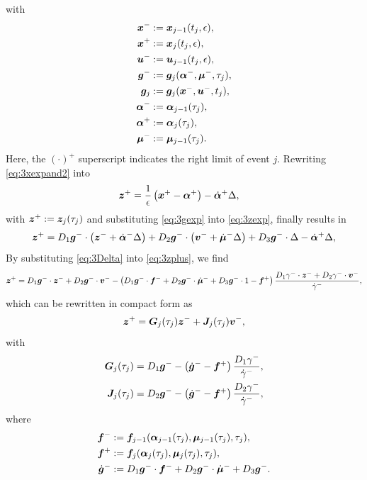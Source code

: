 \documentclass[../DC2017114Bouma.tex]{subfiles}
\begin{document}
with
\begin{align*}
\xb^- &:= \xb_{j-1}(t_{j},\epsilon),\\
\xb^+ &:= \xb_{j}(t_{j},\epsilon),\\
\ub^- &:= \ub_{j-1}(t_{j},\epsilon),\\
\gb^- &:= \gb_j(\alphab^-,\mub^-,\tau_j),\\
\gb_j &:= \gb_j(\xb^-,\ub^-,t_j),\\
\alphab^- &:= \alphab_{j-1}(\tau_j),\\
\alphab^+ &:= \alphab_j(\tau_j),\\
\mub^- &:= \mub_{j-1}(\tau_j).
\end{align*}
Here, the $(\cdot)^+$ superscript indicates the right limit of event $j$. Rewriting \eqref{eq:3xexpand2} into
\begin{align}
\zb^+ &= \frac{1}{\epsilon}\left(\xb^{+} - \alphab^+\right) -\dot{\alphab}^+\Delta,\label{eq:3zexp}
\end{align}
with $\zb^+ := \zb_j(\tau_j)$ and substituting \eqref{eq:3gexp} into \eqref{eq:3zexp}, finally results in
\begin{equation}
\zb^+ = D_1\gb^-\cdot\left(\zb^- + \dot{\alphab}^-\Delta\right) + D_2\gb^-\cdot\left(\vb^- + \dot{\mub}^-\Delta\right) + D_3\gb^-\cdot\Delta - \dot{\alphab}^+\Delta,\label{eq:3zplus}
\end{equation}
By substituting \eqref{eq:3Delta} into \eqref{eq:3zplus}, we find
\begin{align}
\zb^+ = D_1\gb^-\cdot\zb^- + D_2\gb^-\cdot\vb^- - \left(D_1\gb^-\cdot \fb^- + D_2\gb^-\cdot\dot{\mub}^- + D_3\gb^-\cdot 1 - \fb^+\right)\frac{D_1\gamma^-\cdot\zb^- + D_2\gamma^-\cdot\vb^-}{\dot{\gamma}^-},
\end{align}
which can be rewritten in compact form as
\begin{align}
\zb^+ = \Gb_j(\tau_j)\zb^- + \Jb_j(\tau_j)\vb^-,
\end{align}
with 
\begin{align*}
\Gb_j(\tau_j) & = D_1\gb^- - \left(\dot{\gb}^- - \fb^+\right)\frac{D_1\gamma^-}{\dot{\gamma}^-},\\
\Jb_j(\tau_j) & = D_2\gb^- - \left(\dot{\gb}^- - \fb^+\right)\frac{D_2\gamma^-}{\dot{\gamma}^-},
\end{align*}
where
\begin{align*}
\fb^- &:= \fb_{j-1}(\alphab_{j-1}(\tau_j),\mub_{j-1}(\tau_j),\tau_j),\\
\fb^+ &:= \fb_j(\alphab_j(\tau_j),\mub_j(\tau_j),\tau_j),\\
\dot{\gb}^- &:= D_1\gb^-\cdot \fb^- + D_2\gb^-\cdot \dot{\mub}^- + D_3\gb^-.
\end{align*}
\end{document}
